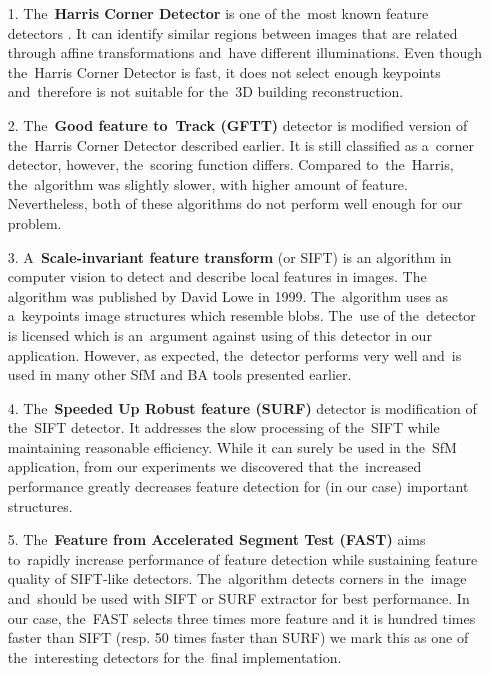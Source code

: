 	
\begin{itemize}
	\item[1.] The~\textbf{Harris Corner Detector} is one of the~most known feature detectors . It can identify similar regions between images that are related through affine transformations and~have different illuminations. Even though the~Harris Corner Detector is fast, it does not select enough keypoints and~therefore is not suitable for the~3D building reconstruction. \cite{www:harris}
	
	\item[2.] The~\textbf{Good feature to~Track (GFTT)} detector is modified version of the~Harris Corner Detector described earlier. It is still classified as a~corner detector, however, the~scoring function differs. Compared to~the~Harris, the~algorithm was slightly slower, with higher amount of feature. Nevertheless, both of these algorithms do not perform well enough for our problem. \cite{article:gftt}
	
	\item[3.] A~\textbf{Scale-invariant feature transform} (or SIFT) is an algorithm in computer vision to detect and describe local features in images. The algorithm was published by David Lowe in 1999. The~algorithm uses as a~keypoints image structures which resemble blobs. The~use of the~detector is licensed which is an~argument against using of this detector in our application. However, as expected, the~detector performs very well and~is used in many other SfM and BA tools presented earlier. \cite{article:sift}
	
	\item[4.] The~\textbf{Speeded Up Robust feature (SURF)} detector is modification of the~SIFT detector. It addresses the slow processing of the~SIFT while maintaining reasonable efficiency. While it can surely be used in the~SfM application, from our experiments we discovered that the~increased performance greatly decreases feature detection for (in our case) important structures.  \cite{www:surf}
	
	\item[5.] The~\textbf{Feature from Accelerated Segment Test (FAST)} aims to~rapidly increase performance of feature detection while sustaining feature quality of SIFT-like detectors. The~algorithm detects corners in the~image and~should be used with SIFT or SURF extractor for best performance. In our case,  the~FAST selects three times more feature and it is hundred times faster than SIFT (resp. 50 times faster than SURF) we mark this as one of the~interesting detectors for the~final implementation. \cite{article:fast}
	

\end{itemize}
